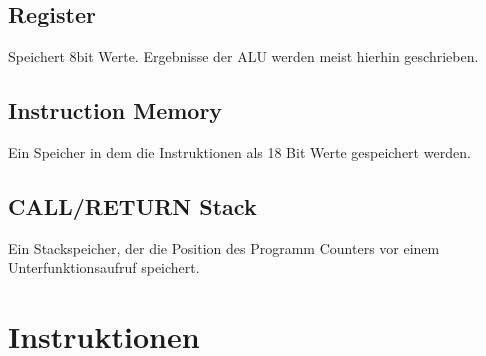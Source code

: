 \documentclass{scrartcl}
\begin{document}
\subsection{Register}
Speichert 8bit Werte. Ergebnisse der ALU werden meist hierhin geschrieben.
\subsection{Instruction Memory}
Ein Speicher in dem die Instruktionen als 18 Bit Werte gespeichert werden.
\subsection{CALL/RETURN Stack}
Ein Stackspeicher, der die Position des Programm Counters vor einem Unterfunktionsaufruf speichert.


\section{Instruktionen}
\end{document}
